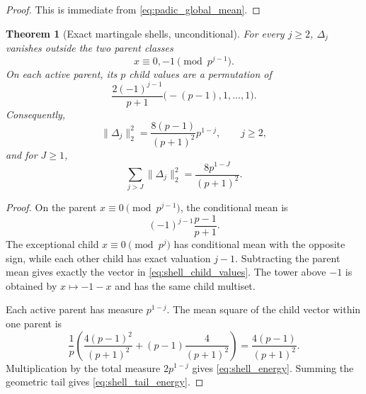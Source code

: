 \documentclass[11pt]{amsart}
\numberwithin{equation}{section}
\theoremstyle{plain}
\newtheorem{theorem}{Theorem}[section]
\theoremstyle{definition}
\theoremstyle{remark}
\begin{document}
\begin{proof}
This is immediate from \eqref{eq:padic_global_mean}.
\end{proof}

\begin{theorem}[Exact martingale shells, unconditional]
\label{thm:exact_shells}
For every $j\ge2$, $\Delta_j$ vanishes outside the two parent classes
\begin{equation}
x\equiv0,-1\pmod{p^{j-1}}.
\label{eq:active_parents}
\end{equation}
On each active parent, its $p$ child values are a permutation of
\begin{equation}
\frac{2(-1)^{j-1}}{p+1}\bigl(-(p-1),1,\ldots,1\bigr).
\label{eq:shell_child_values}
\end{equation}
Consequently,
\begin{equation}
\|\Delta_j\|_2^2
=\frac{8(p-1)}{(p+1)^2}p^{1-j},
\qquad j\ge2,
\label{eq:shell_energy}
\end{equation}
and for $J\ge1$,
\begin{equation}
\sum_{j>J}\|\Delta_j\|_2^2
=\frac{8p^{1-J}}{(p+1)^2}.
\label{eq:shell_tail_energy}
\end{equation}
\end{theorem}

\begin{proof}
On the parent $x\equiv0\pmod{p^{j-1}}$, the conditional mean is
\begin{equation}
(-1)^{j-1}\frac{p-1}{p+1}.
\label{eq:parent_mean_shell}
\end{equation}
The exceptional child $x\equiv0\pmod{p^j}$ has conditional mean with the opposite sign, while each other child has exact valuation $j-1$.  Subtracting the parent mean gives exactly the vector in \eqref{eq:shell_child_values}.  The tower above $-1$ is obtained by $x\mapsto-1-x$ and has the same child multiset.

Each active parent has measure $p^{1-j}$.  The mean square of the child vector within one parent is
\begin{equation}
\frac1p\left(
\frac{4(p-1)^2}{(p+1)^2}
+(p-1)\frac4{(p+1)^2}
\right)
=\frac{4(p-1)}{(p+1)^2}.
\label{eq:child_mean_square}
\end{equation}
Multiplication by the total measure $2p^{1-j}$ gives \eqref{eq:shell_energy}.  Summing the geometric tail gives \eqref{eq:shell_tail_energy}.
\end{proof}
\end{document}

